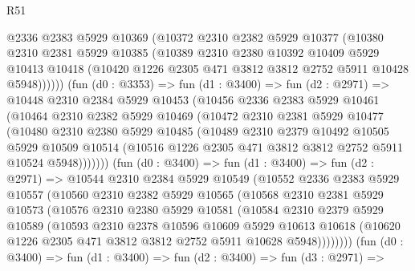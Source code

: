 \begin{lexlean}{R51}
\begin{coremodule}
            @2336
            @2383
            @5929
            @10369
            (@10372
              @2310
              @2382
              @5929
              @10377
              (@10380
                @2310
                @2381
                @5929
                @10385
                (@10389
                  @2310
                  @2380
                  @10392
                  @10409
                  @5929
                  @10413
                  @10418
                  (@10420 @1226 @2305 @471 @3812 @3812 @2752 @5911 @10428 @5948))))))
        (fun (d0 : @3353) =>
        fun (d1 : @3400) =>
        fun (d2 : @2971) =>
        @10448
          @2310
          @2384
          @5929
          @10453
          (@10456
            @2336
            @2383
            @5929
            @10461
            (@10464
              @2310
              @2382
              @5929
              @10469
              (@10472
                @2310
                @2381
                @5929
                @10477
                (@10480
                  @2310
                  @2380
                  @5929
                  @10485
                  (@10489
                    @2310
                    @2379
                    @10492
                    @10505
                    @5929
                    @10509
                    @10514
                    (@10516 @1226 @2305 @471 @3812 @3812 @2752 @5911 @10524 @5948)))))))
        (fun (d0 : @3400) =>
        fun (d1 : @3400) =>
        fun (d2 : @2971) =>
        @10544
          @2310
          @2384
          @5929
          @10549
          (@10552
            @2336
            @2383
            @5929
            @10557
            (@10560
              @2310
              @2382
              @5929
              @10565
              (@10568
                @2310
                @2381
                @5929
                @10573
                (@10576
                  @2310
                  @2380
                  @5929
                  @10581
                  (@10584
                    @2310
                    @2379
                    @5929
                    @10589
                    (@10593
                      @2310
                      @2378
                      @10596
                      @10609
                      @5929
                      @10613
                      @10618
                      (@10620 @1226 @2305 @471 @3812 @3812 @2752 @5911 @10628 @5948))))))))
        (fun (d0 : @3400) =>
        fun (d1 : @3400) =>
        fun (d2 : @3400) =>
        fun (d3 : @2971) =>

\end{coremodule}
\end{lexlean}

